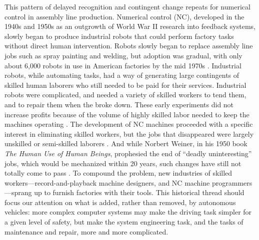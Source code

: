 This pattern of delayed recognition and contingent change repeats for
numerical control in assembly line production. Numerical control (NC),
developed in the 1940s and 1950s as an outgrowth of World War II
research into feedback systems, slowly began to produce industrial
robots that could perform factory tasks without direct human
intervention. Robots slowly began to replace assembly line jobs such
as spray painting and welding, but adoption was gradual, with only
about 6,000 robots in use in American factories by the mid
1970s \cite[p. 159]{nyeAmericas}. Industrial robots, while automating tasks,
had a way of generating large contingents of skilled human laborers
who still needed to be paid for their services. Industrial robots were
complicated, and needed a variety of skilled workers to tend them, and
to repair them when the broke down. These early experiments did not
increase profits because of the volume of highly skilled labor needed
to keep the machines operating \cite[p. 162]{nyeAmericas}. The development of NC machines
proceeded with a specific interest in eliminating skilled workers, but
the jobs that disappeared were largely unskilled or semi-skilled
laborers \cite[p. 164]{nyeAmericas}. And while Norbert Weiner, in his 1950 book \emph{The Human Use of
Human Beings}, prophesied the end of ``deadly uninteresting'' jobs, which
would be mechanized within 20 years, such changes have still not
totally come to pass \cite[p. 161]{nyeAmericas}. To compound the problem, new industries of
skilled workers---record-and-playback machine designers, and NC machine
programmers---sprang up to furnish factories with their tools. This
historical thread should focus our attention on what is added, rather
than removed, by
autonomous vehicles: more complex computer systems may make the driving
task simpler for a given level of safety, but make the system
engineering task, and the tasks of maintenance and repair, more and more complicated.

